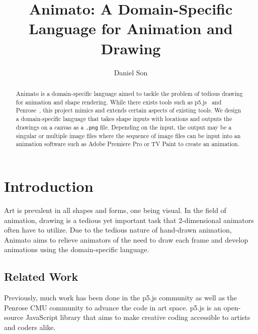 \documentclass[acmsmall,screen]{acmart}
\begin{document}
\title{Animato: A Domain-Specific Language for Animation and Drawing}

\author{Daniel Son}

\renewcommand{\shortauthors}{Daniel Son}

\renewcommand\footnotetextcopyrightpermission[1]{}
\pagestyle{fancy}
\fancyfoot{}
\makeatletter
\let\@authorsaddresses\@empty
\makeatother

\begin{abstract}
    Animato is a domain-specific language aimed to tackle the problem of tedious drawing for animation and shape rendering.
    While there exists tools such as p5.js~\cite{p5js} and Penrose~\cite{penrose}, this project mimics and extends certain aspects of existing tools.
    We design a domain-specific language that takes shape inputs with locations and outputs the drawings on a canvas as a \texttt{.png} file.
    Depending on the input, the output may be a singular or multiple image files where the sequence of image files can be input into an animation software such as Adobe Premiere Pro or TV Paint to create an animation.
\end{abstract}


\maketitle
\thispagestyle{firstfancy}

\section{Introduction}
Art is prevalent in all shapes and forms, one being visual.
In the field of animation, drawing is a tedious yet important task that 2-dimensional animators often have to utilize.
Due to the tedious nature of hand-drawn animation, Animato aims to relieve animators of the need to draw each frame and develop animations using the domain-specific language.

\subsection{Related Work}
Previously, much work has been done in the p5.js \cite{p5js} community as well as the Penrose \cite{penrose} CMU community to advance the code in art space. 
p5.js is an open-source JavaScript library that aims to make creative coding accessible to artists and coders alike. 
\end{document}

